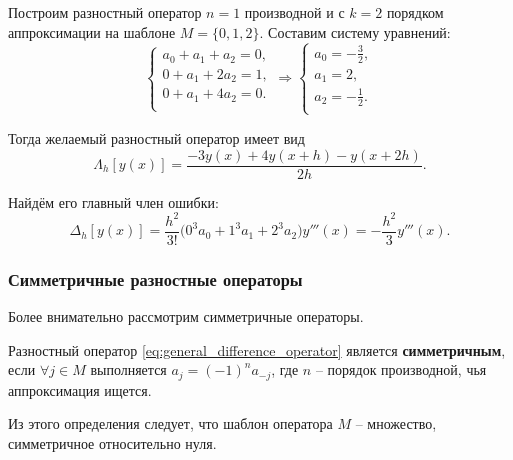 \documentclass[../main.tex]{subfile}
\begin{document}
\begin{example}
	Построим разностный оператор $n=1$ производной и с $k=2$ порядком
	аппроксимации на шаблоне $M=\{0,1,2\}$. Составим систему уравнений:
	\begin{equation*}
		\begin{cases}
			a_0+a_1+a_2=0, \\
			0+a_1+2a_2=1, \\
			0+a_1+4a_2=0. \\
		\end{cases}
		\Rightarrow
		\begin{cases}
			a_0 = -\frac{3}{2}, \\
			a_1 = 2, \\
			a_2 = -\frac{1}{2}. \\
		\end{cases}
	\end{equation*}

	Тогда желаемый разностный оператор имеет вид
	\[\Lambda_h[y(x)]=\frac{-3y(x)+4y(x+h)-y(x+2h)}{2h}.\]

	Найдём его главный член ошибки:
	\[\Delta_h[y(x)]=\frac{h^2}{3!}\big(0^3a_0+1^3a_1+2^3a_2\big)y'''(x)=
	-\frac{h^2}{3}y'''(x).\]
\end{example}
\newpage

\subsubsection{Симметричные разностные операторы}
Более внимательно рассмотрим симметричные операторы.

\begin{define}\label{eq:central_difference_operator}
	Разностный оператор \eqref{eq:general_difference_operator} является
	\textbf{симметричным}, если $\forall j\in M$ выполняется
	$a_j=(-1)^na_{-j}$, где $n$ -- порядок производной, чья аппроксимация
	ищется.
\end{define}

Из этого определения следует, что шаблон оператора $M$ -- множество,
симметричное относительно нуля.
\end{document}
